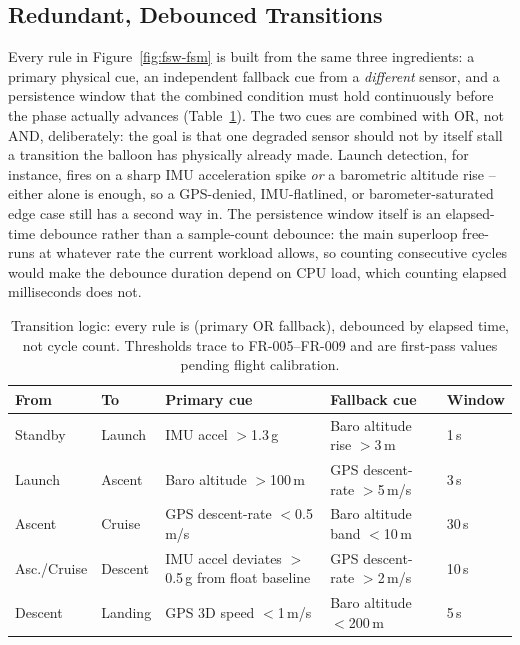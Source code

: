 \subsection{Redundant, Debounced Transitions}

Every rule in Figure~\ref{fig:fsw-fsm} is built from the same three
ingredients: a primary physical cue, an independent fallback cue from a
\emph{different} sensor, and a persistence window that the combined
condition must hold continuously before the phase actually advances
(Table~\ref{tab:fsw-transitions}). The two cues are combined with OR, not
AND, deliberately: the goal is that one degraded sensor should not by
itself stall a transition the balloon has physically already made. Launch
detection, for instance, fires on a sharp IMU acceleration spike \emph{or}
a barometric altitude rise -- either alone is enough, so a GPS-denied,
IMU-flatlined, or barometer-saturated edge case still has a second way in.
The persistence window itself is an elapsed-time debounce rather than a
sample-count debounce: the main superloop free-runs at whatever rate the
current workload allows, so counting consecutive cycles would make the
debounce duration depend on CPU load, which counting elapsed milliseconds
does not.

\begin{table}[H]
\centering
\small
\begin{tabular}{p{2.3cm}p{1.5cm}p{4.3cm}p{4.3cm}p{1.5cm}}
\toprule
\textbf{From} & \textbf{To} & \textbf{Primary cue} & \textbf{Fallback cue} & \textbf{Window} \\
\midrule
Standby & Launch & IMU accel $>$1.3\,g & Baro altitude rise $>$3\,m & 1\,s \\
Launch & Ascent & Baro altitude $>$100\,m & GPS descent-rate $>$5\,m/s & 3\,s \\
Ascent & Cruise & GPS descent-rate $<$0.5\,m/s & Baro altitude band $<$10\,m & 30\,s \\
Asc./Cruise & Descent & IMU accel deviates $>$0.5\,g from float baseline & GPS descent-rate $>$2\,m/s & 10\,s \\
Descent & Landing & GPS 3D speed $<$1\,m/s & Baro altitude $<$200\,m & 5\,s \\
\bottomrule
\end{tabular}
\caption{Transition logic: every rule is (primary OR fallback), debounced
by elapsed time, not cycle count. Thresholds trace to FR-005--FR-009 and
are first-pass values pending flight calibration.}
\label{tab:fsw-transitions}
\end{table}

